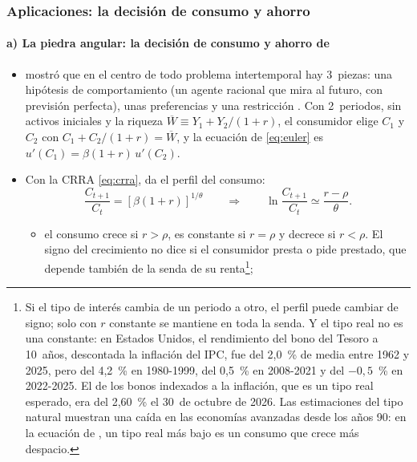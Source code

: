 \documentclass[11pt]{article}
\begin{document}
\subsubsection{Aplicaciones: la decisión de consumo y ahorro}\label{sec:aplicaciones-consumo}

\paragraph{a) La piedra angular: la decisión de consumo y ahorro de }

\begin{itemize}
\item \textcite{Fisher1930Theory} mostró que en el centro de todo problema intertemporal hay 3~piezas: una hipótesis de comportamiento (un agente racional que mira al futuro, con previsión perfecta), unas preferencias y una restricción . Con 2~periodos, sin activos iniciales y la riqueza $\overline W\equiv Y_1+Y_2/(1+r)$, el consumidor elige $C_1$ y $C_2$ con $C_1+C_2/(1+r)=\overline W$, y la ecuación de  \eqref{eq:euler} es $u'(C_1)=\beta(1+r)\,u'(C_2)$.
\item Con la CRRA \eqref{eq:crra}, da el perfil del consumo:
  \begin{equation*}
  \frac{C_{t+1}}{C_t}=\left[\beta(1+r)\right]^{1/\theta}\qquad\Longrightarrow\qquad\ln\frac{C_{t+1}}{C_t}\simeq\frac{r-\rho}{\theta}.
  \end{equation*}
  \begin{itemize}
  \item el consumo crece si $r>\rho$, es constante si $r=\rho$ y decrece si $r<\rho$. El signo del crecimiento no dice si el consumidor presta o pide prestado, que depende también de la senda de su renta\footnote{Si el tipo de interés cambia de un periodo a otro, el perfil puede cambiar de signo; solo con $r$ constante se mantiene en toda la senda. Y el tipo real no es una constante: en Estados Unidos, el rendimiento del bono del Tesoro a 10~años, descontada la inflación del IPC, fue del 2,0~\% de media entre 1962 y 2025, pero del 4,2~\% en 1980-1999, del 0,5~\% en 2008-2021 y del $-0{,}5$~\% en 2022-2025\nocite{FRED2026GS10}. El de los bonos indexados a la inflación, que es un tipo real esperado, era del 2,60~\% el 30~de octubre de 2026\nocite{UST2026RealYield}. Las estimaciones del tipo natural muestran una caída en las economías avanzadas desde los años 90\nocite{HolstonLaubachWilliams2017Measuring}: en la ecuación de , un tipo real más bajo es un consumo que crece más despacio.};

\end{itemize}
\end{itemize}
\end{document}
